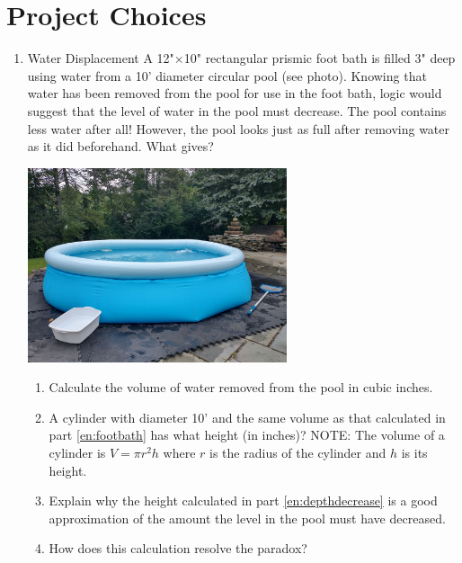 \wbnewpage
\section{Project Choices}\label{sec:RatiosProjects}

\begin{enumerate}

\item Water Displacement A 12"$\times$10" rectangular prismic foot bath is filled 3" deep using water from a 10' diameter circular pool (see photo). Knowing that water has been removed from the pool for use in the foot bath, logic would suggest that the level of water in the pool must decrease. The pool contains less water after all! However, the pool looks just as full after removing water as it did beforehand. What gives?
	\begin{center}\includegraphics[width=3in]{images/pool}\end{center}
	\begin{enumerate}
		\item \label{en:footbath}Calculate the volume of water removed from the pool in cubic inches.
		\item \label{en:depthdecrease}A cylinder with diameter 10' and the same volume as that calculated in part \ref{en:footbath} has what height (in inches)? NOTE: The volume of a cylinder is $V=\pi r^2h$ where $r$ is the radius of the cylinder and $h$ is its height.
		\item Explain why the height calculated in part \ref{en:depthdecrease} is a good approximation of the amount the level in the pool must have decreased.
		\item How does this calculation resolve the paradox?
	\end{enumerate}


\end{enumerate}
